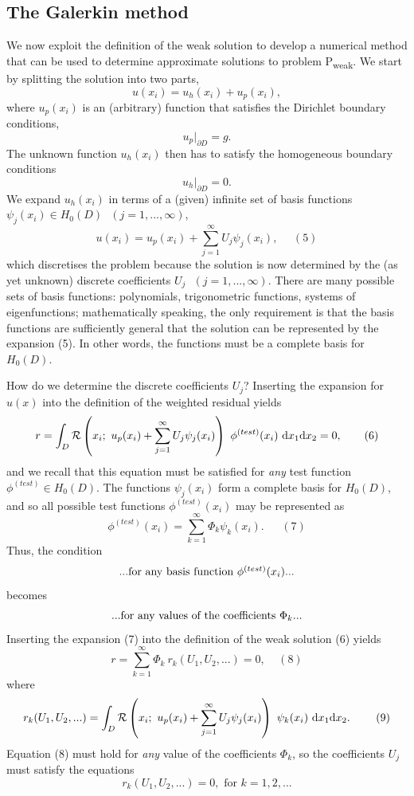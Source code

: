 \hypertarget{index_galerkin}{}\subsection{The Galerkin method}\label{index_galerkin}
We now exploit the definition of the weak solution to develop a numerical method that can be used to determine approximate solutions to problem P\textsubscript{weak}. We start by splitting the solution into two parts, \[ u(x_i) = u_{h}(x_i) + u_{p}(x_i), \] where $ u_{p}(x_i)$ is an (arbitrary) function that satisfies the Dirichlet boundary conditions, \[ u_{p}|_{\partial D} = g. \] The unknown function $ u_{h}(x_i) $ then has to satisfy the homogeneous boundary conditions \[ u_{h}|_{\partial D} = 0.\] We expand $ u_{h}(x_i) $ in terms of a (given) infinite set of basis functions $ \psi_j(x_i) \in H_0(D) \ \ \ (j=1,...,\infty) $, \[ u(x_i) = u_{p}(x_i) + \sum_{j=1}^{\infty} U_j \psi_j(x_i), \ \ \ \ \ \ (5) \] which discretises the problem because the solution is now determined by the (as yet unknown) discrete coefficients $ U_j \ \ \ (j=1,...,\infty). $ There are many possible sets of basis functions\+: polynomials, trigonometric functions, systems of eigenfunctions; mathematically speaking, the only requirement is that the basis functions are sufficiently general that the solution can be represented by the expansion (5). In other words, the functions must be a complete basis for $H_0(D)$.

How do we determine the discrete coefficients $ U_j $? Inserting the expansion for $u(x)$ into the definition of the weighted residual yields \[ r = \int_{D} {\cal R}\left(x_i; \ u_{p}(x_i)+\sum_{j=1}^{\infty} U_j \psi_j(x_i)\right) \ \phi^{(test)}(x_i) \ \mbox{d}x_1 \mbox{d}x_2 = 0, \ \ \ \ \ \ (6) \] and we recall that this equation must be satisfied for {\itshape any} test function $ \phi^{(test)} \in H_0(D) $. The functions $\psi_j(x_i)$ form a complete basis for $ H_0(D)$, and so all possible test functions $ \phi^{(test)}(x_i) $ may be represented as \[ \phi^{(test)}(x_i) = \sum_{k=1}^{\infty} \Phi_k \psi_k(x_i). \ \ \ \ \ \ \ (7) \] Thus, the condition \[ \mbox{...for any basis function $ \phi^{(test)}(x_i) $...} \] becomes \[ \mbox{...for any values of the coefficients $ \Phi_k$...} \] Inserting the expansion (7) into the definition of the weak solution (6) yields \[ r = \sum_{k=1}^{\infty} \Phi_k \ r_k(U_1, U_2,...) = 0, \ \ \ \ \ (8) \] where \[ r_k(U_1, U_2,...) = \int_{D} {\cal R}\left(x_i; \ u_{p}(x_i)+\sum_{j=1}^{\infty} U_j \psi_j(x_i)\right) \ \psi_k(x_i) \ \mbox{d}x_1 \mbox{d}x_2. \ \ \ \ \ \ \ (9) \] Equation (8) must hold for {\itshape any} value of the coefficients $ \Phi_k $, so the coefficients $ U_j $ must satisfy the equations \[ r_k(U_1, U_2,...) = 0, \mbox{ \ \ \ \ for } k=1,2,... \]

